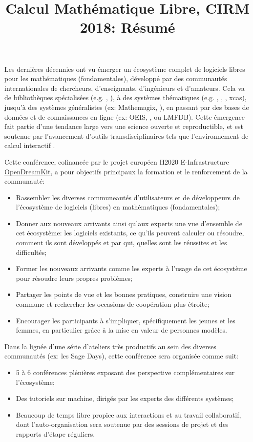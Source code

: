 \documentclass[12pt]{amsbook}
\begin{document}
\title{Calcul Mathématique Libre, CIRM 2018: Résumé}
\maketitle
Les dernières décennies ont vu émerger un écosystème complet de logiciels libres pour les mathématiques (fondamentales), développé par des communautés internationales de chercheurs, d'enseignants, d'ingénieurs et d'amateurs. Cela va de bibliothèques spécialisées (e.g. \MPIR, \Linbox), à des systèmes thématiques (e.g. \GAP, \Pari, \Singular, xcas), jusqu'à des systèmes généralistes (ex: Mathemagix, \Sage), en passant par des bases de données et de connaissances en ligne (ex: OEIS, \MathHub, ou LMFDB). Cette émergence fait partie d'une tendance large vers une science ouverte et reproductible,  et est soutenue par l'avancement d'outils transdisciplinaires tels que l'environnement de calcul interactif \Jupyter.


Cette conférence, cofinancée par le projet européen H2020 E-Infrastructure \href{opendreamkit.org}{OpenDreamKit}, a pour objectifs principaux la formation et le renforcement de la communauté:
\begin{itemize}
\item Rassembler les diverses communeautés d'utilisateurs et de développeurs de l'écosystème de logiciels (libres) en mathématiques (fondamentales);
\item Donner aux nouveaux arrivants ainsi qu'aux experts une vue d'ensemble de cet écosystème: les logiciels existants, ce qu'ils peuvent calculer ou résoudre, comment ils sont développés et par qui, quelles sont les réussites et les difficultés;
\item Former les nouveaux arrivants comme les experts à l'usage de cet écosystème pour résoudre leurs propres problèmes;
\item Partager les points de vue et les bonnes pratiques, construire une vision commune et rechercher les occasions de coopération plus étroite;
\item Encourager les participants à s'impliquer, spécifiquement les jeunes et les femmes, en particulier grâce à la mise en valeur de personnes modèles.
\end{itemize}


Dans la lignée d'une série d'ateliers très productifs au sein des diverses communautés (ex: les Sage Days), cette conférence sera organisée comme suit:
\begin{itemize}
\item 5 à 6 conférences plénières exposant des perspective complémentaires sur l'écosystème;
\item Des tutoriels sur machine, dirigés par les experts des différents systèmes;
\item Beaucoup de temps libre propice aux interactions et au travail
  collaboratif, dont l'auto-organisation sera soutenue par des
  sessions de projet et des rapports d'étape réguliers.
\end{itemize}
\end{document}
